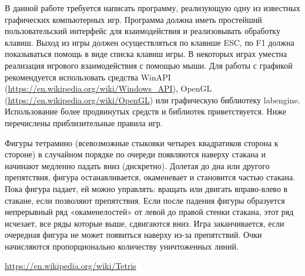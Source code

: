 
В данной работе требуется написать программу, реализующую одну из известных 
графических компьютерных игр. Программа должна иметь простейший пользовательский 
интерфейс для взаимодействия и реализовывать обработку клавиш. Выход из игры 
должен осуществляться по клавише ESC, по F1 должна показываться помощь в виде 
списка клавиш игры. В некоторых играх уместна реализация игрового взаимодействия 
с помощью мыши. Для работы с графикой рекомендуется использовать средства WinAPI
(\url{https://en.wikipedia.org/wiki/Windows_API}), 
OpenGL (\url{https://en.wikipedia.org/wiki/OpenGL}) или 
графическую библиотеку labengine. Использование
более продвинутых средств и библиотек приветствуется. Ниже перечислены 
приблизительные правила игр.

\zzsectionCOMMENTS

\zzsectionPLAN

\zzsectionVARIATIONS

\begin{zztask}[Tetris, 1984]
Фигуры тетрамино (всевозможные стыковки четырех квадратиков сторона к стороне)
в случайном порядке по очереди появляются наверху стакана и начинают медленно
падать вниз (дискретно). Долетая до дна или другого препятствия, фигура
останавливается, окаменевает и становится частью стакана. Пока фигура падает,
ей можно управлять: вращать или двигать вправо-влево в стакане, если позволяют
препятствия. Если после падения фигуры образуется непрерывный ряд
«окаменелостей» от левой до правой стенки стакана, этот ряд исчезает, все ряды
которые выше, сдвигаются вниз. Игра заканчивается, если очередная фигура не
может появиться наверху из-за препятствий. Очки начисляются пропорционально
количеству уничтоженных линий.
\begin{flushright}
 \url{https://en.wikipedia.org/wiki/Tetris}
\end{flushright}
\end{zztask}

